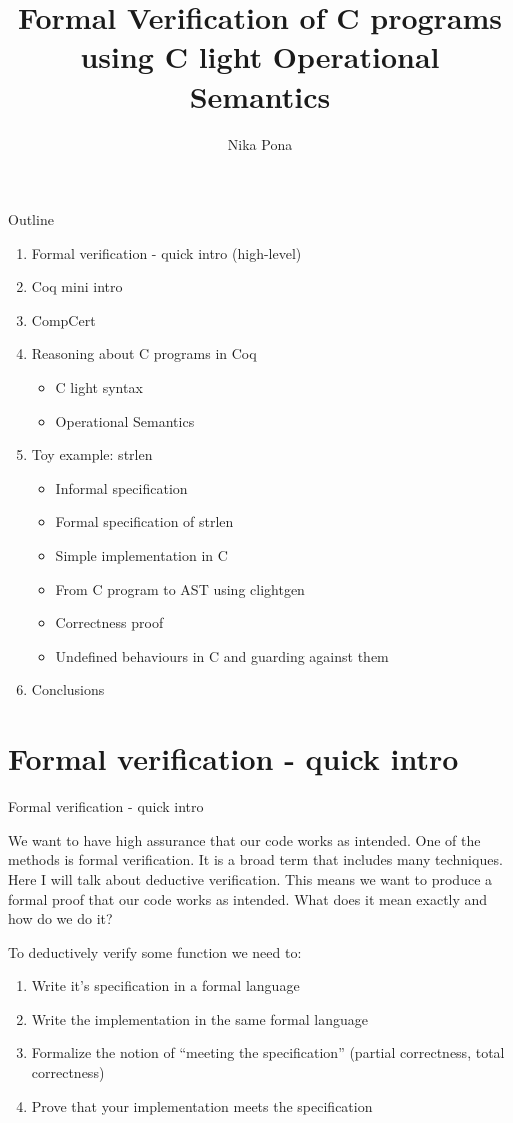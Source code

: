 \documentclass{beamer}
\title{Formal Verification of C programs using C light Operational Semantics}
\author{Nika Pona}
\begin{document}
\maketitle

\begin{frame}{Outline}
\begin{enumerate}
\item Formal verification - quick intro (high-level)
\item Coq mini intro 
\item CompCert

\item Reasoning about C programs in Coq
  \begin{itemize}
    \item C light syntax
   \item Operational Semantics
\end{itemize}
\item Toy example: strlen 
\begin{itemize}
\item Informal specification 
\item Formal specification of strlen 
\item Simple implementation in C
\item From C program to AST using clightgen
\item Correctness proof
\item Undefined behaviours in C and guarding against them
\end{itemize}
\item Conclusions
\end{enumerate} 
\end{frame}

\section{Formal verification - quick intro}
\begin{frame}{Formal verification - quick intro}
 
  We want to have high assurance that our code works as intended. One of the methods is formal verification. It is a broad term that includes many techniques. Here I will talk about deductive verification. This means we want to produce a formal proof that our code works as intended. What does it mean exactly and how do we do it?
  
  \bigskip
  
    To deductively verify some function we need to:
   
  \begin{enumerate}
  \item Write it's specification in a formal language  
  \item Write the implementation in the same formal language
  \item Formalize the notion of ``meeting the specification'' (partial correctness, total correctness)
  \item Prove that your implementation meets the specification
  \end{enumerate}
\end{frame}
\end{document}
